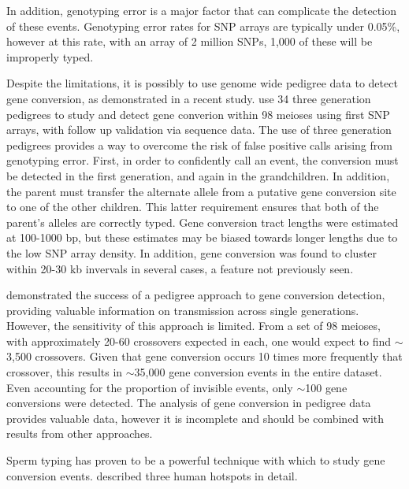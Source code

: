 In addition, genotyping error is a major factor that can complicate the detection of these events.
Genotyping error rates for SNP arrays are typically under 0.05\%\cite{Imai2011}, however at this rate, with an array of 2 million SNPs, 1,000 of these will be improperly typed.

Despite the limitations, it is possibly to use genome wide pedigree data to detect gene conversion, as demonstrated in a recent study.
\citet{Williams2015} use 34 three generation pedigrees to study and detect gene converion within 98 meioses using first SNP arrays, with follow up validation via sequence data.
The use of three generation pedigrees provides a way to overcome the risk of false positive calls arising from genotyping error.
First, in order to confidently call an event, the conversion must be detected in the first generation, and again in the grandchildren.
In addition, the parent must transfer the alternate allele from a putative gene conversion site to one of the other children.
This latter requirement ensures that both of the parent's alleles are correctly typed.
Gene conversion tract lengths were estimated at 100-1000 bp, but these estimates may be biased towards longer lengths due to the low SNP array density.
In addition, gene conversion was found to cluster within 20-30 kb invervals in several cases, a feature not previously seen.


\citet{Williams2015} demonstrated the success of a pedigree approach to gene conversion detection, providing valuable information on transmission across single generations.
However, the sensitivity of this approach is limited.
From a set of 98 meioses, with approximately 20-60 crossovers expected in each, one would expect to find $\sim$3,500 crossovers.
Given that gene conversion occurs 10 times more frequently that crossover, this results in $\sim$35,000 gene conversion events in the entire dataset.
Even accounting for the proportion of invisible events, only $\sim$100 gene conversions were detected.
The analysis of gene conversion in pedigree data provides valuable data, however it is incomplete and should be combined with results from other approaches.


Sperm typing has proven to be a powerful technique with which to study gene conversion events.
\citet{Jeffreys2004} described three human hotspots in detail.



